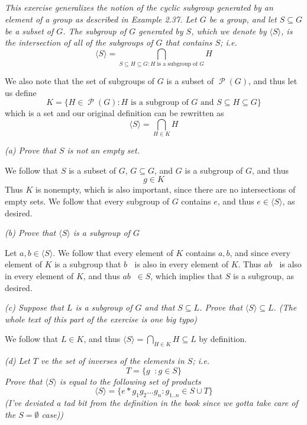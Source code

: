 \documentclass[11pt,oneside,titlepage]{book}
\DeclareMathOperator \pow {\mathcal {P}}
\DeclareMathOperator \inv {^{-1}}
\newcommand{\eangle}[1]{\langle #1 \rangle}
\newcommand{\set}[1]{\{ #1 \}}
\begin{document}
\subsection{}

\textit{This exercise generalizes the notion of the cyclic subgroup
generated by an element of a group as described in Example 2.37.  Let
$G$ be a group, and let $S \subseteq G$ be a subset of $G$. The
subgroup of $G$ generated by $S$, which we denote by $\eangle{S}$, is
the intersection of all of the subgroups of $G$ that contains $S$;
i.e.
  $$\eangle{S} = \bigcap_{S \subseteq H \subseteq G: H\text{ is a subgroup of }G} H$$
}

We also note that the set of subgroups of $G$ is a subset of
$\pow(G)$, and thus let us define
$$K = \set{H \in \pow(G): H\text{ is a subgroup of }G \text{ and }S \subseteq H \subseteq G}$$
which is a set and our original definition can be rewritten as
$$\eangle{S} = \bigcap_{H \in K}{H}$$

\textit{(a) Prove that $S$ is not an empty set.}

We follow that $S$ is a subset of $G$, $G \subseteq G$, and $G$ is a
subgroup of $G$, and thus
$$g \in K$$
Thus $K$ is nonempty, which is also important, since there are no
intersections of empty sets.  We follow that every subgroup of $G$
contains $e$, and thus $e \in \eangle{S}$, as desired.

\textit{(b) Prove that $\eangle{S}$ is a subgroup of $G$}

Let $a, b \in \eangle{S}$. We follow that every element of $K$
contains $a, b$, and since every element of $K$ is a subgroup that
$b\inv$ is also in every element of $K$.  Thus $a b\inv$ is also in
every element of $K$, and thus $a b\inv \in S$, which implies that $S$
is a subgroup, as desired.

\textit{(c) Suppose that $L$ is a subgroup of $G$ and that $S
\subseteq L$. Prove that $\eangle{S} \subseteq L$. (The whole text of
this part of the exercise is one big typo) }

We follow that $L \in K$, and thus $\eangle{S} = \bigcap_{H \in K}{H}
\subseteq L$ by definition.

\textit{(d) Let $T$ ve the set of inverses of the elements in $S$;
i.e.
  $$T = \set{g\inv: g \in S}$$
  Prove that $\eangle{S}$ is equal to the following set of products
  $$\eangle{S} = \set{e * g_1 g_2 ... g_n: g_{1..n} \in S \cup T}$$
  (I've deviated a tad bit from the definition in the book since we
gotta take care of the $S = \emptyset$ case)) }
\end{document}
